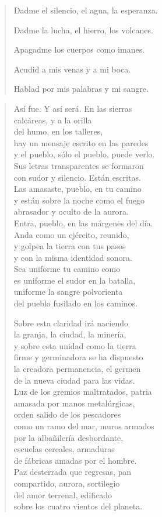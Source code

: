 \documentclass[12pt]{article}
\begin{document}
\begin{verse}
Dadme el silencio, el agua, la esperanza.  

Dadme la lucha, el hierro, los volcanes.  

Apagadme los cuerpos como imanes.  

Acudid a mis venas y a mi boca.  

Hablad por mis palabras y mi sangre.  

\end{verse}

\clearpage
{}
\begin{verse}

Así fue. Y así será. En las sierras\\
calcáreas, y a la orilla\\
del humo, en los talleres,\\
hay un mensaje escrito en las paredes\\
y el pueblo, sólo el pueblo, puede verlo.\\
Sus letras transparentes se formaron\\
con sudor y silencio. Están escritas.\\
Las amasaste, pueblo, en tu camino\\
y están sobre la noche como el fuego\\
abrasador y oculto de la aurora.\\
Entra, pueblo, en las márgenes del día.\\
Anda como un ejército, reunido,\\
y golpea la tierra con tus pasos\\
y con la misma identidad sonora.\\
Sea uniforme tu camino como\\
es uniforme el sudor en la batalla,\\
uniforme la sangre polvorienta\\
del pueblo fusilado en los caminos.  

Sobre esta claridad irá naciendo\\
la granja, la ciudad, la minería,\\
y sobre esta unidad como la tierra\\
firme y germinadora se ha dispuesto\\
la creadora permanencia, el germen\\
de la nueva ciudad para las vidas.\\
Luz de los gremios maltratados, patria\\
amasada por manos metalúrgicas,\\
orden salido de los pescadores\\
como un ramo del mar, muros armados\\
por la albañilería desbordante,\\
escuelas cereales, armaduras\\
de fábricas amadas por el hombre.\\
Paz desterrada que regresas, pan\\
compartido, aurora, sortilegio\\
del amor terrenal, edificado\\
sobre los cuatro vientos del planeta.  

\end{verse}
\end{document}
